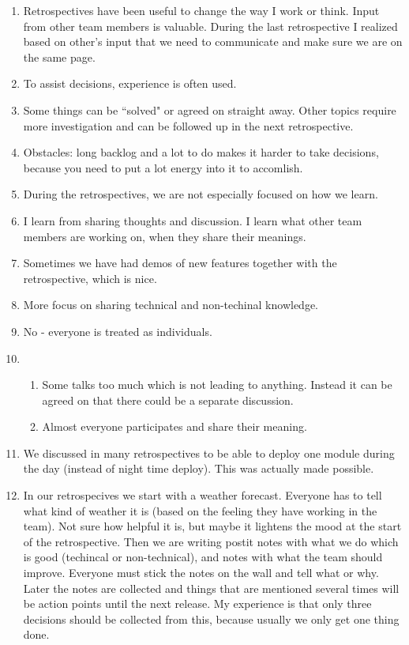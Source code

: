 \documentclass[12pt, a4paper]{report}
\begin{document}
\begin{enumerate}
\item Retrospectives have been useful to change the way I work or think. Input from other team members is valuable. During the last retrospective I realized based on other's input that we need to communicate and make sure we are on the same page.
\item To assist decisions, experience is often used.
\item Some things can be ``solved" or agreed on straight away. Other topics require more investigation and can be followed up in the next retrospective.
\item Obstacles: long backlog and a lot to do makes it harder to take decisions, because you need to put a lot energy into it to accomlish.
\item During the retrospectives, we are not especially focused on how we learn.
\item I learn from sharing thoughts and discussion. I learn what other team members are working on, when they share their meanings.
\item Sometimes we have had demos of new features together with the retrospective, which is nice.
\item More focus on sharing technical and non-techinal knowledge.
\item No - everyone is treated as individuals.
\item \begin{enumerate}
	\item Some talks too much which is not leading to anything. Instead it can be agreed on that there could be a separate discussion.
	\item Almost everyone participates and share their meaning.
\end{enumerate}
\item We discussed in many retrospectives to be able to deploy one module during the day (instead of night time deploy). This was actually made possible.
\item In our retrospecives we start with a weather forecast. Everyone has to tell what kind of weather it is (based on the feeling they have working in the team). Not sure how helpful it is, but maybe it lightens the mood at the start of the retrospective. Then we are writing postit notes with what we do which is good (techincal or non-technical), and notes with what the team should improve. Everyone must stick the notes on the wall and tell what or why. Later the notes are collected and things that are mentioned several times will be action points until the next release. My experience is that only three decisions should be collected from this, because usually we only get one thing done.
\end{enumerate}
\end{document}
